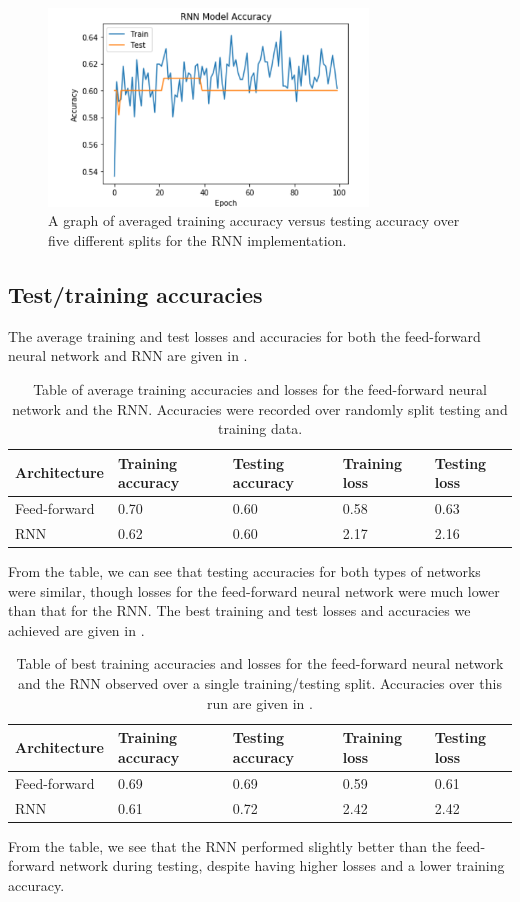 \documentclass{article}
\begin{document}
\begin{figure}[htb]
	\centering
	\includegraphics[width = 8.5cm]{figs/rnn_graph}
	\caption{A graph of averaged training accuracy versus testing accuracy over five different splits for the RNN implementation.}
	\label{fig:rnn_graph}
\end{figure}

\subsection{Test/training accuracies}
\label{subsec:tables}

The average training and test losses and accuracies for both the feed-forward neural network and RNN are given in .
\begin{table}[ht]
	\centering
	\begin{tabularx}{\linewidth}{|X|X|X|X|X|}
		\hline
		Ar\-chi\-tec\-ture & Training accuracy & Testing accuracy & Training loss & Testing loss \\
		\hline
		Feed-forward & 0.70 & 0.60 & 0.58 & 0.63 \\
		\hline
		RNN & 0.62 & 0.60 & 2.17 & 2.16 \\
		\hline
	\end{tabularx}
	\caption{Table of average training accuracies and losses for the feed-forward neural network and the RNN. Accuracies were recorded over randomly split testing and training data.}
	\label{tab:avg_acc}
\end{table}
From the table, we can see that testing accuracies for both types of networks were similar, though losses for the feed-forward neural network were much lower than that for the RNN.
The best training and test losses and accuracies we achieved are given in .
\begin{table}[!ht]
	\centering
	\begin{tabularx}{\linewidth}{|X|X|X|X|X|}
		\hline
		Ar\-chi\-tec\-ture & Training accuracy & Testing accuracy & Training loss & Testing loss \\
		\hline
		Feed-forward & 0.69 & 0.69 & 0.59 & 0.61 \\
		\hline
		RNN & 0.61 & 0.72 & 2.42 & 2.42 \\
		\hline
	\end{tabularx}
	\caption{Table of best training accuracies and losses for the feed-forward neural network and the RNN observed over a single training/testing split. Accuracies over this run are given in .}
	\label{tab:best_acc}
\end{table}
From the table, we see that the RNN performed slightly better than the feed-forward network during testing, despite having higher losses and a lower training accuracy.
\end{document}
